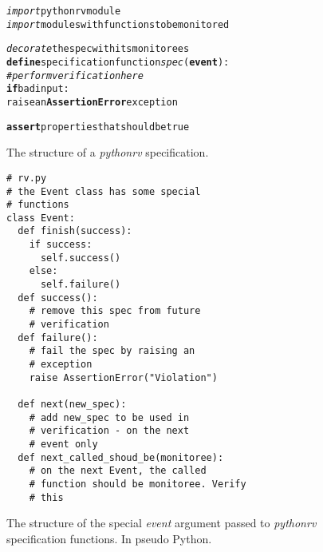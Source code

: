 \begin{figure}[h!]
	\begin{center}
	\begin{minipage}{0.7\textwidth}
    \begin{alltt}
\emph{import} pythonrv module
\emph{import} modules with functions to be monitored

\emph{decorate} the spec with its monitorees
\textbf{define} specification function \textit{spec}(\textbf{event}):
  \textit{# perform verification here}
  \textbf{if} bad input:
    raise an \textbf{AssertionError} exception

  \textbf{assert} properties that should be true
    \end{alltt}
	\end{minipage}
	\end{center}

  \caption{The structure of a \textit{pythonrv} specification.}
	\label{figure-pseudo-spec}
\end{figure}

\begin{figure}[h!]
	\begin{center}
	\begin{minipage}{0.7\textwidth}
	\begin{lstlisting}
# rv.py
# the Event class has some special
# functions
class Event:
  def finish(success):
    if success:
      self.success()
    else:
      self.failure()
  def success():
    # remove this spec from future
    # verification
  def failure():
    # fail the spec by raising an
    # exception
    raise AssertionError("Violation")

  def next(new_spec):
    # add new_spec to be used in
    # verification - on the next
    # event only
  def next_called_shoud_be(monitoree):
    # on the next Event, the called
    # function should be monitoree. Verify
    # this
	\end{lstlisting}
	\end{minipage}
	\end{center}

  \caption{The structure of the special \textit{event} argument passed to
    \textit{pythonrv} specification functions. In pseudo Python.}
	\label{figure-event-functions}
\end{figure}

